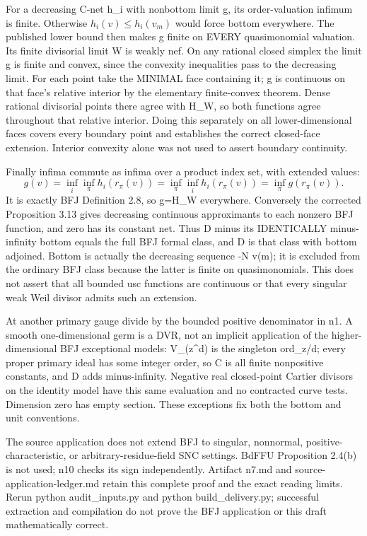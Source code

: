 \documentclass[11pt]{article}
\begin{document}
For a decreasing C-net h\_i with nonbottom limit g, its order-valuation infimum is finite. Otherwise \(h_i(v)\le h_i(v_m)\) would force bottom everywhere. The published lower bound then makes g finite on EVERY quasimonomial valuation. Its finite divisorial limit W is weakly nef. On any rational closed simplex the limit g is finite and convex, since the convexity inequalities pass to the decreasing limit. For each point take the MINIMAL face containing it; g is continuous on that face's relative interior by the elementary finite-convex theorem. Dense rational divisorial points there agree with H\_W, so both functions agree throughout that relative interior. Doing this separately on all lower-dimensional faces covers every boundary point and establishes the correct closed-face extension. Interior convexity alone was not used to assert boundary continuity.

Finally infima commute as infima over a product index set, with extended values:
\[
 g(v)=\inf_i\inf_\pi h_i(r_\pi(v))
     =\inf_\pi\inf_i h_i(r_\pi(v))
     =\inf_\pi g(r_\pi(v)).
\]
It is exactly BFJ Definition 2.8, so g=H\_W everywhere. Conversely the corrected Proposition 3.13 gives decreasing continuous approximants to each nonzero BFJ function, and zero has its constant net. Thus D minus its IDENTICALLY minus-infinity bottom equals the full BFJ formal class, and D is that class with bottom adjoined. Bottom is actually the decreasing sequence -N v(m); it is excluded from the ordinary BFJ class because the latter is finite on quasimonomials. This does not assert that all bounded usc functions are continuous or that every singular weak Weil divisor admits such an extension.

At another primary gauge divide by the bounded positive denominator in n1. A smooth one-dimensional germ is a DVR, not an implicit application of the higher-dimensional BFJ exceptional models: V\_(z\textasciicircum{}d) is the singleton ord\_z/d; every proper primary ideal has some integer order, so C is all finite nonpositive constants, and D adds minus-infinity. Negative real closed-point Cartier divisors on the identity model have this same evaluation and no contracted curve tests. Dimension zero has empty section. These exceptions fix both the bottom and unit conventions.

The source application does not extend BFJ to singular, nonnormal, positive-characteristic, or arbitrary-residue-field SNC settings. BdFFU Proposition 2.4(b) is not used; n10 checks its sign independently. Artifact n7.md and source-application-ledger.md retain this complete proof and the exact reading limits. Rerun python audit\_inputs.py and python build\_delivery.py; successful extraction and compilation do not prove the BFJ application or this draft mathematically correct.
\end{document}
